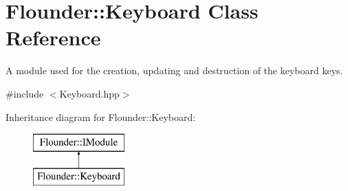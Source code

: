 \hypertarget{class_flounder_1_1_keyboard}{}\section{Flounder\+:\+:Keyboard Class Reference}
\label{class_flounder_1_1_keyboard}


A module used for the creation, updating and destruction of the keyboard keys.  




{\ttfamily \#include $<$Keyboard.\+hpp$>$}

Inheritance diagram for Flounder\+:\+:Keyboard\+:\begin{figure}[H]
\begin{center}
\leavevmode
\includegraphics[height=2.000000cm]{class_flounder_1_1_keyboard}
\end{center}
\end{figure}
